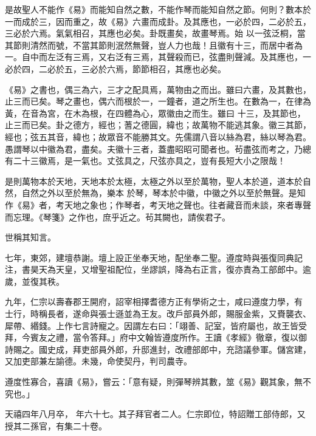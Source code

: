 \begin{pinyinscope}
 是故聖人不能作《易》而能知自然之數，不能作琴而能知自然之節。何則？數本於一而成於三，因而重之，故《易》六畫而成卦。及其應也，一必於四，二必於五，三必於六焉。氣氣相召，其應也必矣。卦既畫矣，故畫琴焉。始
 以一弦泛桐，當其節則清然而號，不當其節則泯然無聲，豈人力也哉！且徽有十三，而居中者為一。自中而左泛有三焉，又右泛有三焉，其聲殺而已，弦盡則聲減。及其應也，一必於四，二必於五，三必於六焉，節節相召，其應也必矣。



 《易》之書也，偶三為六，三才之配具焉，萬物由之而出。雖曰六畫，及其數也，止三而已矣。琴之畫也，偶六而根於一，一鐘者，道之所生也。在數為一，在律為黃，在音為宮，在木為根，在四體為心，眾徽由之而生。雖曰
 十三，及其節也，止三而已矣。卦之德方，經也；蓍之德圓，緯也；故萬物不能逃其象。徽三其節，經也；弦五其音，緯也；故眾音不能勝其文。先儒謂八音以絲為君，絲以琴為君。愚謂琴以中徽為君，盡矣。夫徽十三者，蓋盡昭昭可聞者也。茍盡弦而考之，乃總有二十三徽焉，是一氣也。丈弦具之，尺弦亦具之，豈有長短大小之限哉！



 是則萬物本於天地，天地本於太極，太極之外以至於萬物，聖人本於道，道本於自然，自然之外以至於無為，樂本
 於琴，琴本於中徽，中徽之外以至於無聲。是知作《易》者，考天地之象也；作琴者，考天地之聲也。往者藏音而未談，來者專聲而忘理。《琴箋》之作也，庶乎近之。茍其闕也，請俟君子。



 世稱其知言。



 七年，東郊，建壇恭謝。壇上設正坐奉天地，配坐奉二聖。遵度時與張復同典記注，書昊天為天皇，又增聖祖配位，坐謬誤，降為右正言，復亦責為工部郎中。逾歲，並復其秩。



 九年，仁宗以壽春郡王開府，詔宰相擇耆德方正有學術之士，咸曰遵度力學，有
 士行，時稱長者，遂命與張士遜並為王友。改戶部員外郎，賜服金紫，又賚襲衣、犀帶、緡錢。上作七言詩寵之。因謂左右曰：「翊善、記室，皆府屬也，故王皆受拜，今賓友之禮，當令答拜。」府中文翰皆遵度所作。王讀《孝經》徹章，復以御詩賜之。國史成，拜吏部員外郎，升邸進封，改禮部郎中，充諮議參軍。儲宮建，又加吏部兼左諭德。未幾，命使契丹，判司農寺。



 遵度性寡合，喜讀《易》，嘗云：「意有疑，則彈琴辨其數，筮《易》觀其象，無不究也。」



 天禧四年八月卒，
 年六十七。其子拜官者二人。仁宗即位，特詔贈工部侍郎，又授其二孫官，有集二十卷。




\end{pinyinscope}
